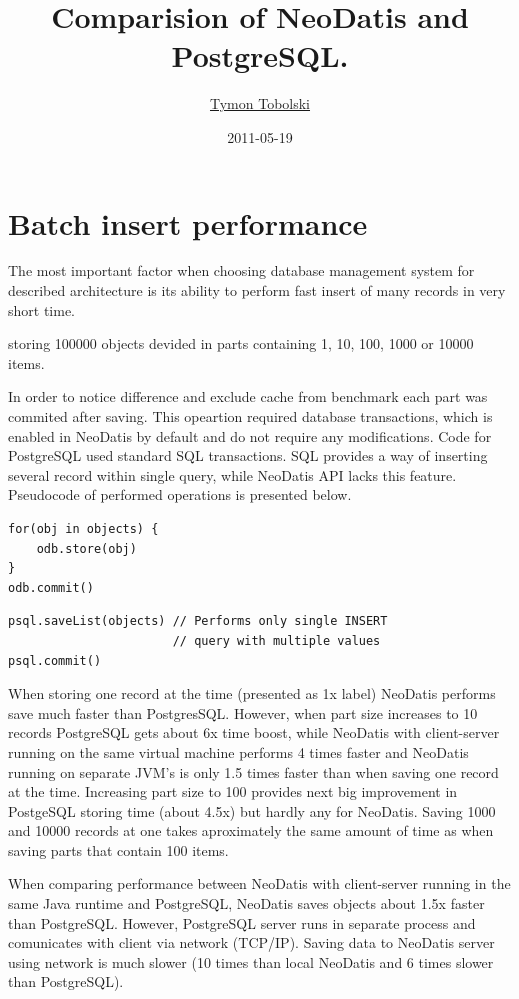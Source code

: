 \documentclass[a4paper,titlepage,12pt]{article}
\title{Comparision of NeoDatis and PostgreSQL.}
\author{\href{mailto:i@teamon.eu}{Tymon Tobolski}}
\date{2011-05-19}
\begin{document}
\maketitle
\tableofcontents


\section{Batch insert performance}\label{sec:batch_insert}


The most important factor when choosing database management system for described architecture is its ability to perform fast insert of many records in very short time.

storing 100000 objects devided in parts containing 1, 10, 100, 1000 or 10000 items.

In order to notice difference and exclude cache from benchmark each part was commited after saving. This opeartion required database transactions, which is enabled in NeoDatis by default and do not require any modifications. Code for PostgreSQL used standard SQL transactions. SQL provides a way of inserting several record within single query, while NeoDatis API lacks this feature. Pseudocode of performed operations is presented below.

\begin{lstlisting}[caption=NeoDatis code]
for(obj in objects) {
    odb.store(obj)
}
odb.commit()
\end{lstlisting}

\begin{lstlisting}[caption=PostgeSQL code]
psql.saveList(objects) // Performs only single INSERT 
                       // query with multiple values
psql.commit()
\end{lstlisting}



When storing one record at the time (presented as 1x label) NeoDatis performs save much faster than PostgresSQL. However, when part size increases to 10 records PostgreSQL gets about 6x time boost, while NeoDatis with client-server running on the same virtual machine performs 4 times faster and NeoDatis running on separate JVM's is only 1.5 times faster than when saving one record at the time. Increasing part size to 100 provides next big improvement in PostgeSQL storing time (about 4.5x) but hardly any for NeoDatis.
Saving 1000 and 10000 records at one takes aproximately the same amount of time as when saving parts that contain 100 items.

When comparing performance between NeoDatis with client-server running in the same Java runtime and PostgreSQL, NeoDatis saves objects about 1.5x faster than PostgreSQL. However, PostgreSQL server runs in separate process and comunicates with client via network (TCP/IP). Saving data to NeoDatis server using network is much slower (10 times than local NeoDatis and 6 times slower than PostgreSQL).
\end{document}

